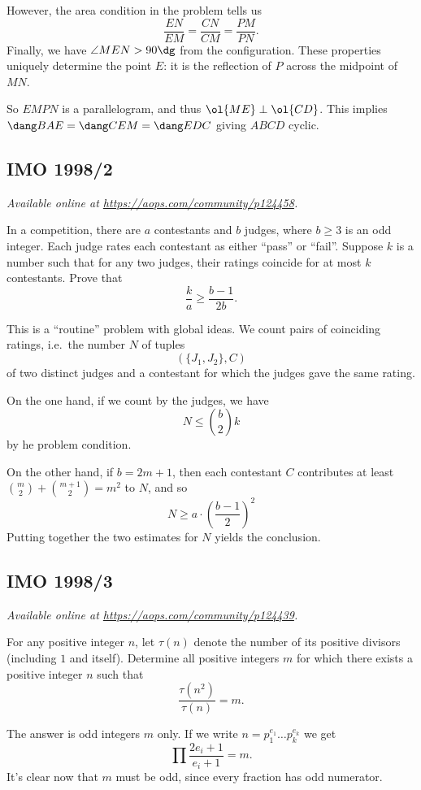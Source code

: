 \documentclass[11pt]{scrartcl}
\begin{document}
However, the area condition in the problem tells us
\[ \frac{EN}{EM} = \frac{CN}{CM} = \frac{PM}{PN}. \]
Finally, we have $\angle MEN > 90\dg$ from the configuration.
These properties uniquely determine the point $E$:
it is the reflection of $P$ across the midpoint of $MN$.

So $EMPN$ is a parallelogram,
and thus $\ol{ME} \perp \ol{CD}$.
This implies $\dang BAE = \dang CEM = \dang EDC$ giving $ABCD$ cyclic.
\pagebreak

\subsection{IMO 1998/2}
\textsl{Available online at \url{https://aops.com/community/p124458}.}
\begin{mdframed}[style=mdpurplebox,frametitle={Problem statement}]
In a competition, there are $a$ contestants
and $b$ judges, where $b \ge 3$ is an odd integer.
Each judge rates each contestant as either ``pass'' or ``fail''.
Suppose $k$ is a number such that for any two judges,
their ratings coincide for at most $k$ contestants.
Prove that
\[ \frac ka \ge \frac{b-1}{2b}. \]
\end{mdframed}
This is a ``routine'' problem with global ideas.
We count pairs of coinciding ratings,
i.e.\ the number $N$ of tuples
\[(\{J_1, J_2\}, C) \]
of two distinct judges and a contestant
for which the judges gave the same rating.

On the one hand, if we count by the judges,
we have \[ N \le \binom b2 k \]
by he problem condition.

On the other hand, if $b=2m+1$, then
each contestant $C$
contributes at least $\binom{m}{2} + \binom{m+1}{2} = m^2$ to $N$,
and so
\[ N \ge a \cdot \left( \frac{b-1}{2} \right)^2 \]
Putting together the two estimates for $N$ yields the conclusion.
\pagebreak

\subsection{IMO 1998/3}
\textsl{Available online at \url{https://aops.com/community/p124439}.}
\begin{mdframed}[style=mdpurplebox,frametitle={Problem statement}]
For any positive integer $n$,
let $\tau (n)$ denote the number of its positive divisors
(including $1$ and itself).
Determine all positive integers $m$ for which
there exists a positive integer $n$ such that
\[ \frac{\tau (n^{2})}{\tau (n)}=m. \]
\end{mdframed}
The answer is odd integers $m$ only.
If we write $n = p_1^{e_1} \dots p_k^{e_k}$ we get
\[ \prod \frac{2e_i+1}{e_i+1} = m. \]
It's clear now that $m$ must be odd,
since every fraction has odd numerator.
\end{document}
